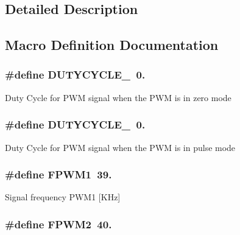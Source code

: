 \subsection{Detailed Description}


\subsection{Macro Definition Documentation}
\hypertarget{group__beacon_signal___macro_ga97d7361385c99d61f06a2b5d9135a2c2}{
\subsubsection[{D\+U\+T\+Y\+C\+Y\+C\+L\+E\+\_\+0}]{\setlength{\rightskip}{0pt plus 5cm}\#define D\+U\+T\+Y\+C\+Y\+C\+L\+E\+\_~0.}}\label{group__beacon_signal___macro_ga97d7361385c99d61f06a2b5d9135a2c2}
Duty Cycle for P\+W\+M signal when the P\+W\+M is in zero mode \hypertarget{group__beacon_signal___macro_ga9d871143d27f7b01c887609eb96d7b71}{
\subsubsection[{D\+U\+T\+Y\+C\+Y\+C\+L\+E\+\_\+50}]{\setlength{\rightskip}{0pt plus 5cm}\#define D\+U\+T\+Y\+C\+Y\+C\+L\+E\+\_~0.}}\label{group__beacon_signal___macro_ga9d871143d27f7b01c887609eb96d7b71}
Duty Cycle for P\+W\+M signal when the P\+W\+M is in pulse mode \hypertarget{group__beacon_signal___macro_ga49376f249aeca65c4a534dbc8afdf4cd}{
\subsubsection[{F\+P\+W\+M1}]{\setlength{\rightskip}{0pt plus 5cm}\#define F\+P\+W\+M1~39.}}\label{group__beacon_signal___macro_ga49376f249aeca65c4a534dbc8afdf4cd}
Signal frequency P\+W\+M1 \mbox{[}K\+Hz\mbox{]} \hypertarget{group__beacon_signal___macro_gad4b2ed9e61715e40bbab12d10d8182e9}{
\subsubsection[{F\+P\+W\+M2}]{\setlength{\rightskip}{0pt plus 5cm}\#define F\+P\+W\+M2~40.}}\label{group__beacon_signal___macro_gad4b2ed9e61715e40bbab12d10d8182e9}
